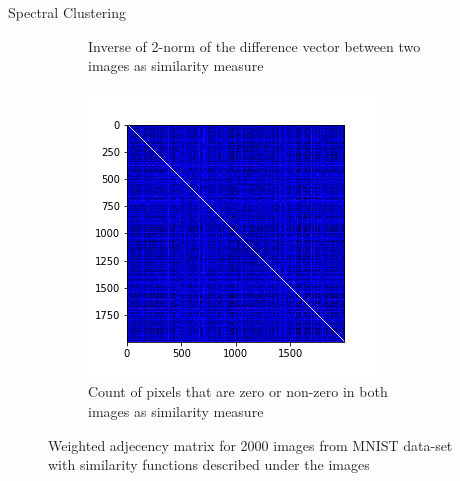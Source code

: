 \documentclass[10pt,a4paper, nocenter]{beamer}
\begin{document}
\begin{frame}{Spectral Clustering}
\begin{figure}[h]
\begin{center}
\begin{subfigure}[b]{0.3\textwidth}
				\caption{Inverse of 2-norm of the difference vector between two images as similarity measure}
				\label{fig:w_2norm}
			\end{subfigure}           
			\begin{subfigure}[b]{0.3\textwidth}
				\centering
				\includegraphics[width=\textwidth]{../../images/w_hamming.png}
				\caption{Count of pixels that are zero or non-zero in both images as similarity measure}
				\label{fig:w_hamming}
			\end{subfigure}           
		\end{center}
		\caption{Weighted adjecency matrix for 2000 images from MNIST data-set with similarity functions described under the images}
		\label{fig:mnistWImages}
	\end{figure}
	
	\end{frame}
	
\end{document}
